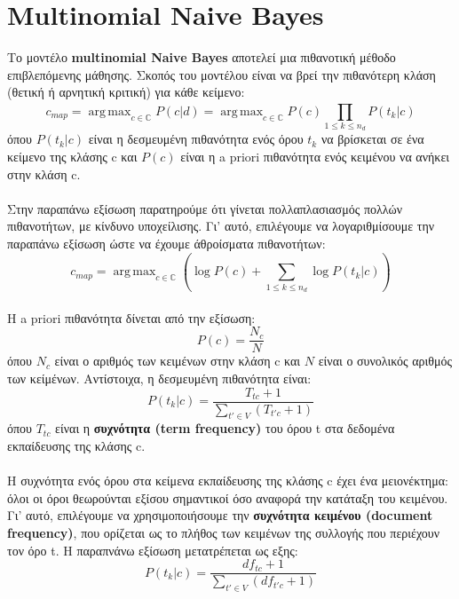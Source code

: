 \documentclass[12pt]{article}
\DeclareMathOperator*{\argmax}{arg\,max}
\begin{document}
\section{Multinomial Naive Bayes}
Το μοντέλο \textbf{multinomial Naive Bayes} αποτελεί μια πιθανοτική μέθοδο επιβλεπόμενης μάθησης. Σκοπός του μοντέλου είναι να βρεί την πιθανότερη κλάση (θετική ή αρνητική κριτική) για κάθε κείμενο:
\begin{equation*}
 c_{map} = \argmax_{c \in \mathbb{C}} P(c|d) = \argmax_{c \in \mathbb{C}} P(c) \prod_{1 \leq k \leq n_{d}}^{}P(t_{k}|c)
\end{equation*}
όπου $P(t_{k}|c)$ είναι η δεσμευμένη πιθανότητα ενός όρου $t_{k}$ να βρίσκεται σε ένα κείμενο της κλάσης c και $P(c)$ είναι η a priori πιθανότητα ενός κειμένου να ανήκει στην κλάση c.\\\\
Στην παραπάνω εξίσωση παρατηρούμε ότι γίνεται πολλαπλασιασμός πολλών πιθανοτήτων, με κίνδυνο υποχείλισης. Γι' αυτό, επιλέγουμε να λογαριθμίσουμε την παραπάνω εξίσωση ώστε να έχουμε άθροίσματα πιθανοτήτων:
\begin{equation*}
    c_{map} = \argmax_{c \in \mathbb{C}} ( \log{P(c)} + \sum_{1 \leq k \leq n_{d}}^{}\log{P(t_{k}|c)} )
\end{equation*}\\
Η a priori πιθανότητα δίνεται από την εξίσωση:
\begin{equation*}
    P(c) = \frac{N_{c}}{N}
\end{equation*}
όπου $N_{c}$ είναι ο αριθμός των κειμένων στην κλάση c και $N$ είναι ο συνολικός αριθμός των κείμένων. Αντίστοιχα, η δεσμευμένη πιθανότητα είναι:
\begin{equation*}
    P(t_{k}|c) = \frac{T_{tc} + 1}{\sum_{t' \in V}^{}(T_{t'c}+1)}
\end{equation*}
όπου $T_{tc}$ είναι η \textbf{συχνότητα (term frequency)} του όρου t στα δεδομένα εκπαίδευσης της κλάσης c.\\\\
Η συχνότητα ενός όρου στα κείμενα εκπαίδευσης της κλάσης c έχει ένα μειονέκτημα: όλοι οι όροι θεωρούνται εξίσου σημαντικοί όσο αναφορά την κατάταξη του κειμένου. Γι' αυτό, επιλέγουμε να χρησιμοποιήσουμε την \textbf{συχνότητα κειμένου (document frequency)}, που ορίζεται ως το πλήθος των κειμένων της συλλογής που περιέχουν τον όρο t. Η παραπνάνω εξίσωση μετατρέπεται ως εξης:
\begin{equation*}
    P(t_{k}|c) = \frac{df_{tc} + 1}{\sum_{t' \in V}^{}(df_{t'c}+1)}
\end{equation*}
\end{document}
